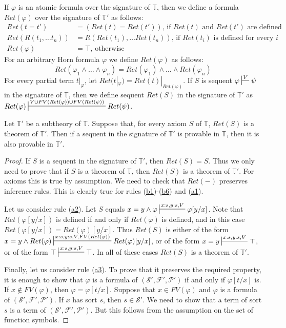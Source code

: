 \documentclass[reqno]{amsart}
\newcommand{\axref}[1]{(\hyperref[ax:#1]{#1})}
\theoremstyle{definition}
\theoremstyle{remark}
\numberwithin{figure}{section}
\begin{document}
If $\varphi$ is an atomic formula over the signature of $\mathbb{T}$, then we define a formula $Ret(\varphi)$ over the signature of $\mathbb{T}'$ as follows:
\begin{align*}
Ret(t = t') & = (Ret(t) = Ret(t')) \text{, if $Ret(t)$ and $Ret(t')$ are defined} \\
Ret(R(t_1, \ldots t_n)) & = R(Ret(t_1), \ldots Ret(t_n)) \text{, if $Ret(t_i)$ is defined for every $i$} \\
Ret(\varphi) & = \top \text{, otherwise}
\end{align*}
For an arbitrary Horn formula $\varphi$ we define $Ret(\varphi)$ as follows:
\[ Ret(\varphi_1 \land \ldots \land \varphi_n) = Ret(\varphi_1) \land \ldots \land Ret(\varphi_n) \]
For every partial term $t|_\varphi$, let $Ret(t|_\varphi) = Ret(t)|_{Ret(\varphi)}$.
If $S$ is sequent $\varphi \sststile{}{V} \psi$ in the signature of $\mathbb{T}$,
    then we define sequent $Ret(S)$ in the signature of $\mathbb{T}'$ as $Ret(\varphi) \sststile{}{V \cup FV(Ret(\varphi)) \cup FV(Ret(\psi))} Ret(\psi)$.

\begin{lem}[subtheory]
Let $\mathbb{T}'$ be a subtheory of $\mathbb{T}$.
Suppose that, for every axiom $S$ of $\mathbb{T}$, $Ret(S)$ is a theorem of $\mathbb{T}'$.
Then if a sequent in the signature of $\mathbb{T}'$ is provable in $\mathbb{T}$, then it is also provable in $\mathbb{T}'$.
\end{lem}
\begin{proof}
If $S$ is a sequent in the signature of $\mathbb{T}'$, then $Ret(S) = S$.
Thus we only need to prove that if $S$ is a theorem of $\mathbb{T}$, then $Ret(S)$ is a theorem of $\mathbb{T}'$.
For axioms this is true by assumption.
We need to check that $Ret(-)$ preserves inference rules.
This is clearly true for rules \axref{b1}-\axref{b6} and \axref{a1}.

Let us consider rule \axref{a2}.
Let $S$ equals $x = y \land \varphi \sststile{}{x:s,y:s,V} \varphi[y/x]$.
Note that $Ret(\varphi[y/x])$ is defined if and only if $Ret(\varphi)$ is defined, and in this case $Ret(\varphi[y/x]) = Ret(\varphi)[y/x]$.
Thus $Ret(S)$ is either of the form $x = y \land Ret(\varphi) \sststile{}{x:s,y:s,V,FV(Ret(\varphi))} Ret(\varphi)[y/x]$,
or of the form $x = y \sststile{}{x:s,y:s,V} \top$, or of the form $\top \sststile{}{x:s,y:s,V} \top$.
In all of these cases $Ret(S)$ is a theorem of $\mathbb{T}'$.

Finally, let us consider rule \axref{a3}.
To prove that it preserves the required property, it is enough to show that $\varphi$ is a formula of $(\mathcal{S}',\mathcal{F}',\mathcal{P}')$ if and only if $\varphi[t/x]$ is.
If $x \notin FV(\varphi)$, then $\varphi = \varphi[t/x]$.
Suppose that $x \in FV(\varphi)$ and $\varphi$ is a formula of $(\mathcal{S}',\mathcal{F}',\mathcal{P}')$.
If $x$ has sort $s$, then $s \in \mathcal{S}'$.
We need to show that a term of sort $s$ is a term of $(\mathcal{S}',\mathcal{F}',\mathcal{P}')$.
But this follows from the assumption on the set of function symbols.
\end{proof}
\end{document}
